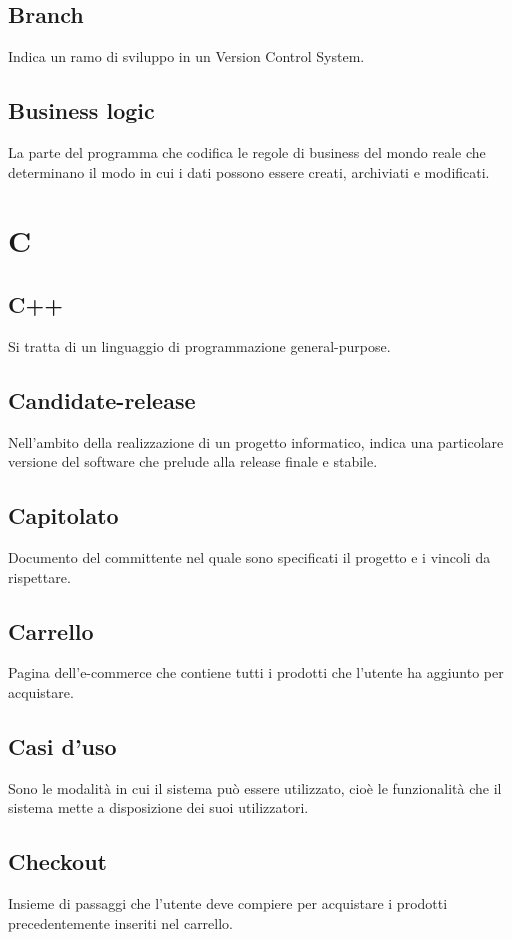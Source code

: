 \subsection*{Branch}
Indica un ramo di sviluppo in un Version Control System.

\subsection*{Business logic}
La parte del programma che codifica le regole di business del mondo reale che determinano il modo in cui i dati possono essere creati, archiviati e modificati.

\newpage
\section{C}
\subsection*{C++}
Si tratta di un linguaggio di programmazione general-purpose.

\subsection*{Candidate-release}
Nell'ambito della realizzazione di un progetto informatico, indica una particolare versione del software che prelude alla release finale e stabile.

\subsection*{Capitolato}
Documento del committente nel quale sono specificati il progetto e i vincoli da rispettare. 
\subsection*{Carrello}
Pagina dell'e-commerce che contiene tutti i prodotti che l'utente ha aggiunto per acquistare.

\subsection*{Casi d'uso}
Sono le modalità in cui il sistema può essere utilizzato, cioè le funzionalità che il sistema mette a disposizione dei suoi utilizzatori.

\subsection*{Checkout}
Insieme di passaggi che l'utente deve compiere per acquistare i prodotti precedentemente inseriti nel carrello.

